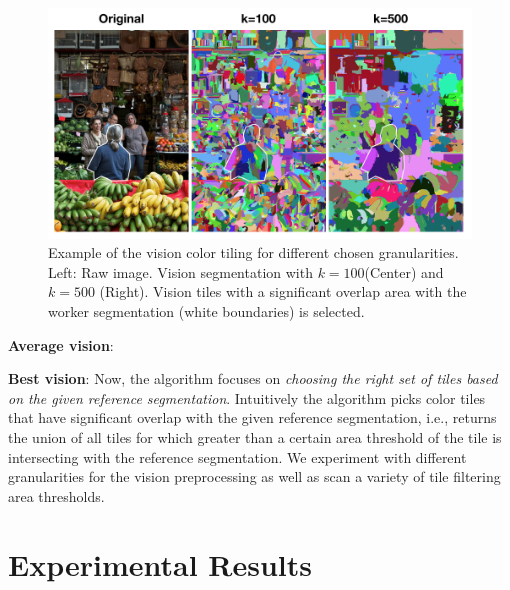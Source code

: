 \begin{figure}
\vspace{-30pt}
\centering
\includegraphics[width=0.9\linewidth]{plots/vision_tiles.png}
\caption{Example of the vision color tiling for different chosen granularities. Left: Raw image. Vision segmentation with $k=100$(Center) and $k=500$ (Right). Vision tiles with a significant overlap area with the worker segmentation (white boundaries) is selected.}
\label{vision_example}
\end{figure}

\par \noindent\textbf{Average vision}: 
\par \noindent\textbf{Best vision}: 
Now, the algorithm focuses on {\em choosing the right set of tiles based on the given reference segmentation}. 
Intuitively the algorithm picks color tiles that have significant overlap with the given reference segmentation, i.e., returns the union of all tiles for which greater than a certain area threshold of the tile is intersecting with the reference segmentation. We experiment with different granularities for the vision preprocessing as well as scan a variety of tile filtering area thresholds. 

\section{Experimental Results\label{sec:experiment}}

